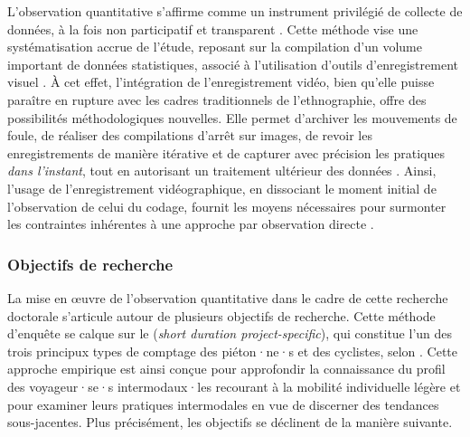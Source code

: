 \begin{refsegment}
L'observation quantitative s'affirme comme un instrument privilégié de collecte de données, à la fois non participatif et transparent \textcolor{blue}{\autocite[248]{paugam_enquete_2012}}. Cette méthode vise une systématisation accrue de l'étude, reposant sur la compilation d'un volume important de données statistiques, associé à l'utilisation d'outils d'enregistrement visuel \textcolor{blue}{\autocite[42, 44]{filion_compter_2011}}. À cet effet, l’intégration de l’enregistrement vidéo, bien qu’elle puisse paraître en rupture avec les cadres traditionnels de l’ethnographie, offre des possibilités méthodologiques nouvelles. Elle permet d’archiver les mouvements de foule, de réaliser des compilations d’arrêt sur images, de revoir les enregistrements de manière itérative et de capturer avec précision les pratiques \textsl{dans l’instant}, tout en autorisant un traitement ultérieur des données \textcolor{blue}{\autocite[131]{meyer_elements_2013}}. Ainsi, l’usage de l’enregistrement vidéographique, en dissociant le moment initial de l’observation de celui du codage, fournit les moyens nécessaires pour surmonter les contraintes inhérentes à une approche par observation directe \textcolor{blue}{\autocite[130]{peneff_mesure_1995}}.%

\subsubsection*{Objectifs de recherche
    \label{chap3:objectifs-observation-quantitative}
    }
    
La mise en œuvre de l'observation quantitative dans le cadre de cette recherche doctorale s'articule autour de plusieurs objectifs de recherche. Cette méthode d'enquête se calque sur le  (\textsl{short duration project-specific}), qui constitue l'un des trois principux types de comptage des piéton·ne·s et des cyclistes, selon \textcolor{blue}{\textcite[4-20]{johnstone_collecting_2017}}. Cette approche empirique est ainsi conçue pour approfondir la connaissance du profil des voyageur·se·s intermodaux·les recourant à la mobilité individuelle légère et pour examiner leurs pratiques intermodales en vue de discerner des tendances sous-jacentes. Plus précisément, les objectifs se déclinent de la manière suivante.%


\end{refsegment}
